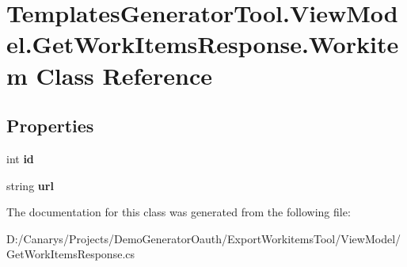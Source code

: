 \hypertarget{class_templates_generator_tool_1_1_view_model_1_1_get_work_items_response_1_1_workitem}{}\section{Templates\+Generator\+Tool.\+View\+Model.\+Get\+Work\+Items\+Response.\+Workitem Class Reference}
\label{class_templates_generator_tool_1_1_view_model_1_1_get_work_items_response_1_1_workitem}
\subsection*{Properties}
\begin{DoxyCompactItemize}
\item 
\mbox{\label{class_templates_generator_tool_1_1_view_model_1_1_get_work_items_response_1_1_workitem_a61f14d895bd5387c9f621cd4bb325b58}} 
int {\bfseries id}
\item 
\mbox{\label{class_templates_generator_tool_1_1_view_model_1_1_get_work_items_response_1_1_workitem_ac0c95e7f35ff289765d7638a8aae3693}} 
string {\bfseries url}
\end{DoxyCompactItemize}


The documentation for this class was generated from the following file\+:\begin{DoxyCompactItemize}
\item 
D\+:/\+Canarys/\+Projects/\+Demo\+Generator\+Oauth/\+Export\+Workitems\+Tool/\+View\+Model/Get\+Work\+Items\+Response.\+cs\end{DoxyCompactItemize}

